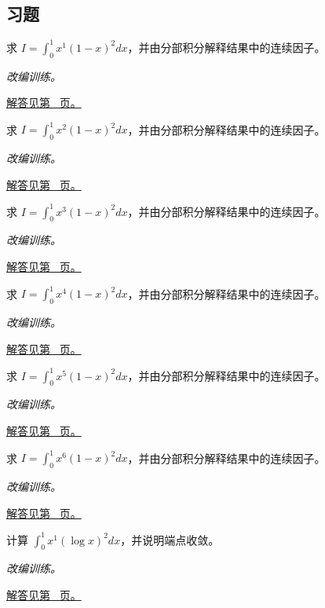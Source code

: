\documentclass[UTF8,12pt,a4paper,fontset=fandol]{ctexart}
\begin{document}
\subsection{习题}
\begin{example}\label{ex:c20q1}
求 $I=\displaystyle\int_0^1x^{1}(1-x)^2dx$，并由分部积分解释结果中的连续因子。
\par\textit{改编训练。}\par\hyperref[ans:c20q1]{解答见第~\pageref{ans:c20q1} 页。}
\end{example}
\begin{example}\label{ex:c20q2}
求 $I=\displaystyle\int_0^1x^{2}(1-x)^2dx$，并由分部积分解释结果中的连续因子。
\par\textit{改编训练。}\par\hyperref[ans:c20q2]{解答见第~\pageref{ans:c20q2} 页。}
\end{example}
\begin{example}\label{ex:c20q3}
求 $I=\displaystyle\int_0^1x^{3}(1-x)^2dx$，并由分部积分解释结果中的连续因子。
\par\textit{改编训练。}\par\hyperref[ans:c20q3]{解答见第~\pageref{ans:c20q3} 页。}
\end{example}
\begin{example}\label{ex:c20q4}
求 $I=\displaystyle\int_0^1x^{4}(1-x)^2dx$，并由分部积分解释结果中的连续因子。
\par\textit{改编训练。}\par\hyperref[ans:c20q4]{解答见第~\pageref{ans:c20q4} 页。}
\end{example}
\begin{example}\label{ex:c20q5}
求 $I=\displaystyle\int_0^1x^{5}(1-x)^2dx$，并由分部积分解释结果中的连续因子。
\par\textit{改编训练。}\par\hyperref[ans:c20q5]{解答见第~\pageref{ans:c20q5} 页。}
\end{example}
\begin{example}\label{ex:c20q6}
求 $I=\displaystyle\int_0^1x^{6}(1-x)^2dx$，并由分部积分解释结果中的连续因子。
\par\textit{改编训练。}\par\hyperref[ans:c20q6]{解答见第~\pageref{ans:c20q6} 页。}
\end{example}
\begin{example}[对数权重的定积分]\label{ex:c20q7}
计算 $\displaystyle\int_0^1x^{1}(\log x)^2dx$，并说明端点收敛。
\par\textit{改编训练。}\par\hyperref[ans:c20q7]{解答见第~\pageref{ans:c20q7} 页。}
\end{example}
\end{document}
